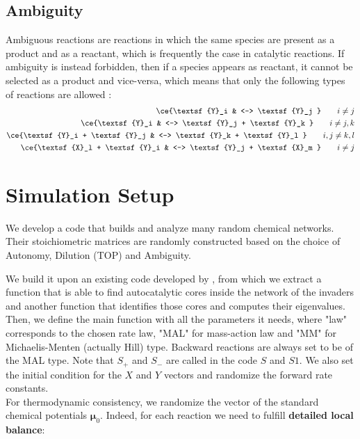\documentclass{article}
\begin{document}
\subsection{Ambiguity}\label{amb}
Ambiguous reactions are reactions in which the same species are present as a product and as a reactant, which is frequently the case in catalytic reactions. If ambiguity is instead forbidden, then if a species appears as reactant, it cannot be selected as a product and vice-versa, which means that  only the following types of reactions are allowed :
\begin{equation}
		\begin{split}
\ce{\textsf{Y}_i & <--> \textsf{Y}_j } \quad \quad i \neq j \\ 
\ce{\textsf{Y}_i & <--> \textsf{Y}_j + \textsf{Y}_k } \quad \quad i \neq j,k \\ 
\ce{\textsf{Y}_i + \textsf{Y}_j & <--> \textsf{Y}_k + \textsf{Y}_l } \quad \quad i,j \neq k,l \\ 
\ce{\textsf{X}_l + \textsf{Y}_i & <--> \textsf{Y}_j + \textsf{X}_m } \quad \quad i \neq j \\ 
\end{split} 
\end{equation}


\section{Simulation Setup}
We develop a code that builds and analyze many random chemical networks. Their stoichiometric matrices are randomly constructed based on the choice of
Autonomy, Dilution (TOP) and Ambiguity.

We build it upon an existing code developed by \cite{3}, from which we extract a function that is able to find autocatalytic cores inside the network of the invaders and another function that identifies those cores and computes their eigenvalues.
Then, we define the main function with all the parameters it needs, where "law" corresponds to the chosen rate law, "MAL" for mass-action law and "MM" for Michaelis-Menten (actually Hill) type. Backward reactions are always set to be of the MAL type.
Note that $S_+$ and $S_-$ are called in the code $S$ and $S1$. We also set the initial condition for the $X$ and $Y$ vectors and randomize the forward rate constants.\\

For thermodynamic consistency, we randomize the vector of the standard chemical potentials $\pmb{\mu}_0$. Indeed, for each reaction we need to fulfill \textbf{detailed local balance}:
\end{document}

